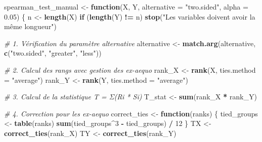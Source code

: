 \documentclass[
  12pt,
]{article}
\newenvironment{Shaded}{\begin{snugshade}}{\end{snugshade}}
\newcommand{\AttributeTok}[1]{\textcolor[rgb]{0.13,0.29,0.53}{#1}}
\newcommand{\CommentTok}[1]{\textcolor[rgb]{0.56,0.35,0.01}{\textit{#1}}}
\newcommand{\ControlFlowTok}[1]{\textcolor[rgb]{0.13,0.29,0.53}{\textbf{#1}}}
\newcommand{\DecValTok}[1]{\textcolor[rgb]{0.00,0.00,0.81}{#1}}
\newcommand{\FloatTok}[1]{\textcolor[rgb]{0.00,0.00,0.81}{#1}}
\newcommand{\FunctionTok}[1]{\textcolor[rgb]{0.13,0.29,0.53}{\textbf{#1}}}
\newcommand{\NormalTok}[1]{#1}
\newcommand{\OtherTok}[1]{\textcolor[rgb]{0.56,0.35,0.01}{#1}}
\newcommand{\SpecialCharTok}[1]{\textcolor[rgb]{0.81,0.36,0.00}{\textbf{#1}}}
\newcommand{\StringTok}[1]{\textcolor[rgb]{0.31,0.60,0.02}{#1}}
\begin{document}
\begin{Shaded}
\begin{Highlighting}[]
\NormalTok{spearman\_test\_manual }\OtherTok{\textless{}{-}} \ControlFlowTok{function}\NormalTok{(X, Y, }\AttributeTok{alternative =} \StringTok{"two.sided"}\NormalTok{, }\AttributeTok{alpha =} \FloatTok{0.05}\NormalTok{) \{}
\NormalTok{  n }\OtherTok{\textless{}{-}} \FunctionTok{length}\NormalTok{(X)}
  \ControlFlowTok{if}\NormalTok{ (}\FunctionTok{length}\NormalTok{(Y) }\SpecialCharTok{!=}\NormalTok{ n) }\FunctionTok{stop}\NormalTok{(}\StringTok{"Les variables doivent avoir la même longueur"}\NormalTok{)}
  
  \CommentTok{\# 1. Vérification du paramètre alternative}
\NormalTok{  alternative }\OtherTok{\textless{}{-}} \FunctionTok{match.arg}\NormalTok{(alternative, }\FunctionTok{c}\NormalTok{(}\StringTok{"two.sided"}\NormalTok{, }\StringTok{"greater"}\NormalTok{, }\StringTok{"less"}\NormalTok{))}
  
  \CommentTok{\# 2. Calcul des rangs avec gestion des ex{-}aequo}
\NormalTok{  rank\_X }\OtherTok{\textless{}{-}} \FunctionTok{rank}\NormalTok{(X, }\AttributeTok{ties.method =} \StringTok{"average"}\NormalTok{)}
\NormalTok{  rank\_Y }\OtherTok{\textless{}{-}} \FunctionTok{rank}\NormalTok{(Y, }\AttributeTok{ties.method =} \StringTok{"average"}\NormalTok{)}
  
  \CommentTok{\# 3. Calcul de la statistique T = Σ(Ri * Si)}
\NormalTok{  T\_stat }\OtherTok{\textless{}{-}} \FunctionTok{sum}\NormalTok{(rank\_X }\SpecialCharTok{*}\NormalTok{ rank\_Y)}
  
  \CommentTok{\# 4. Correction pour les ex{-}aequo}
\NormalTok{  correct\_ties }\OtherTok{\textless{}{-}} \ControlFlowTok{function}\NormalTok{(ranks) \{}
\NormalTok{    tied\_groups }\OtherTok{\textless{}{-}} \FunctionTok{table}\NormalTok{(ranks)}
    \FunctionTok{sum}\NormalTok{(tied\_groups}\SpecialCharTok{\^{}}\DecValTok{3} \SpecialCharTok{{-}}\NormalTok{ tied\_groups) }\SpecialCharTok{/} \DecValTok{12}
\NormalTok{  \}}
\NormalTok{  TX }\OtherTok{\textless{}{-}} \FunctionTok{correct\_ties}\NormalTok{(rank\_X)}
\NormalTok{  TY }\OtherTok{\textless{}{-}} \FunctionTok{correct\_ties}\NormalTok{(rank\_Y)}
  

\end{Highlighting}
\end{Shaded}
\end{document}
